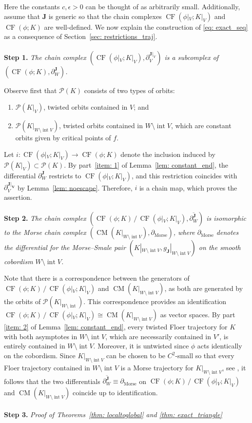 \documentclass[12pt]{article}
\theoremstyle{theorem}
\theoremstyle{definition}
\theoremstyle{remark}
\numberwithin{equation}{section}
\newcommand{\p}{\partial}
\DeclareMathOperator{\morse}{Morse}
\DeclareMathOperator{\CF}{CF}
\DeclareMathOperator{\CM}{CM}
\DeclareMathOperator{\Int}{int}
\begin{document}
Here the constants $c,\epsilon>0$ can be thought of as arbitrarily small.
Additionally, assume that ${\bm J}$ is generic so that the chain complexes $\CF(\phi|_V;K|_V)$ and $\CF(\phi;K)$ are well-defined.
We now explain the construction of \eqref{eq: exact_seq} as a consequence of Section~\ref{sec: restrictions_traj}.\\\\
{\bf Step 1.} \emph{The chain complex $(\CF(\phi|_V;K|_V),\p_V^{\bm{J}|_V})$ is a subcomplex of $(\CF(\phi;K), \p_W^{\bm{J}})$.}

Observe first that $\mathcal{P}(K)$ consists of two types of orbits:
\begin{enumerate}
	\item $\mathcal{P}(K|_V)$, twisted orbits  contained in $V$; and
	\item $\mathcal{P}(K|_{W\setminus \Int V})$, twisted orbits contained in $W \setminus \Int V$, which are constant orbits given by critical points of $f$.
\end{enumerate}
Let $i\colon \CF(\phi|_V;K|_V)\to \CF(\phi;K)$ denote the inclusion induced by $\mathcal{P}(K|_V)\subset \mathcal{P}(K)$.
By part~\eqref{item: 1} of Lemma~\ref{lem: constant_end}, the differential $\p_W^{\bm{J}}$ restricts to $\CF(\phi|_V;K|_V)$, and this restriction coincides with $\p^{\bm{J|_V}}_V$ by Lemma~\ref{lem: noescape}.
Therefore, $i$ is a chain map, which proves the assertion.
\\\\
{\bf Step 2.} \emph{The chain complex $(\CF(\phi;K)\, /\, \CF(\phi|_V;K|_V),\overline{\p^{\bm J}_W})$ is isomorphic to the Morse chain complex $(\CM(K|_{W\setminus \Int V}),\p_{\morse})$, where $\p_{\morse}$ denotes the differential for the Morse--Smale pair $(K|_{W\setminus \Int V},g_{\bm{J}}|_{W\setminus \Int V})$ on the smooth cobordism $W\setminus \Int V$.}

Note that there is a correspondence between the generators of $\CF(\phi;K)\, /\, \CF(\phi|_V;K|_V)$ and $\CM(K|_{W\setminus \Int V})$, as both are generated by the orbits of $\mathcal{P}(K|_{W\setminus \Int})$.
This correspondence provides an identification $\CF(\phi;K)\, /\, \CF(\phi|_V;K|_V) \cong \CM(K|_{W\setminus \Int V})$ as vector spaces.
By part \eqref{item: 2} of Lemma~\ref{lem: constant_end}, every twisted Floer trajectory for $K$ with both asymptotes in $W\setminus \Int V$, which are necessarily contained in $V'$, is entirely contained in $W\setminus \Int V$.
Moreover, it is untwisted since $\phi$ acts identically on the cobordism.
Since $K|_{W\setminus \Int V}$ can be chosen to be $C^2$-small so that every Floer trajectory contained in $W\setminus \Int V$ is a Morse trajectory for $K|_{W\setminus \Int V}$, see \cite[Theorem~7.3]{SaZe92}, 
it follows that the two differentials $\overline{\p^{\bm{J}}_W}\equiv \p_{\morse}$ on $\CF(\phi;K)\, /\, \CF(\phi|_V;K|_V)$ and $\CM(K|_{W\setminus \Int V})$ coincide up to identification.\\\\
{\bf Step 3.} \emph{Proof of Theorems~\ref{thm: localtoglobal} and \ref{thm: exact_triangle}}
\end{document}
